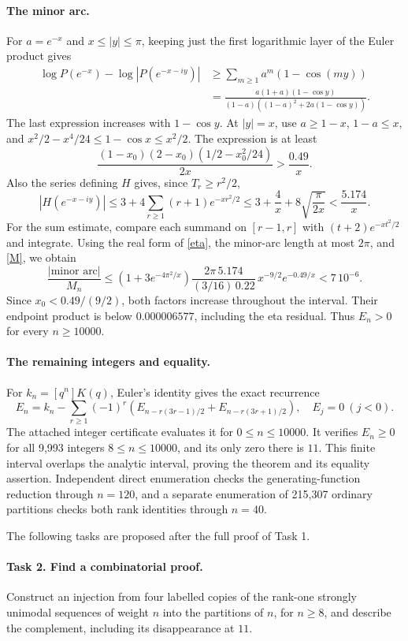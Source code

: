 \documentclass[11pt]{article}
\begin{document}
\paragraph{The minor arc.}
For \(a=e^{-x}\) and \(x\leq|y|\leq\pi\), keeping just the first
logarithmic layer of the Euler product gives
\begin{align*}
 \log P(e^{-x})-\log|P(e^{-x-iy})|
 &\geq\sum_{m\geq1}a^m(1-\cos(my))\\
 &=\frac{a(1+a)(1-\cos y)}
 {(1-a)((1-a)^2+2a(1-\cos y))}.
\end{align*}
The last expression increases with \(1-\cos y\).
At \(|y|=x\), use \(a\geq1-x\), \(1-a\leq x\), and
\(x^2/2-x^4/24\leq1-\cos x\leq x^2/2\). The expression is at least
\[
 \frac{(1-x_0)(2-x_0)(1/2-x_0^2/24)}{2x}>\frac{0.49}{x}.
\]
Also the series defining \(H\) gives, since \(T_r\geq r^2/2\),
\[
 |H(e^{-x-iy})|
 \leq3+4\sum_{r\geq1}(r+1)e^{-xr^2/2}
 \leq3+\frac4x+8\sqrt{\frac\pi{2x}}<\frac{5.174}{x}.
\]
For the sum estimate, compare each summand on \([r-1,r]\) with
\((t+2)e^{-xt^2/2}\) and integrate.
Using the real form of \eqref{eta}, the minor-arc length at most \(2\pi\),
and \eqref{M}, we obtain
\[
 \frac{|\text{minor arc}|}{M_n}
 \leq (1+3e^{-4\pi^2/x})
 \frac{2\pi\,5.174}{(3/16)\,0.22}\,
 x^{-9/2}e^{-0.49/x}<7\,10^{-6}.
\]
Since \(x_0<0.49/(9/2)\), both factors increase throughout the interval.
Their endpoint product is below \(0.000006577\), including the eta residual.
Thus \(E_n>0\) for every \(n\geq10000\).

\paragraph{The remaining integers and equality.}
For \(k_n=[q^n]K(q)\), Euler's identity gives the exact recurrence
\[
 E_n=k_n-\sum_{r\geq1}(-1)^r
 \left(E_{n-r(3r-1)/2}+E_{n-r(3r+1)/2}\right),
 \quad E_j=0\ (j<0).
\]
The attached integer certificate evaluates it for \(0\leq n\leq10000\).
It verifies \(E_n\geq0\) for all 9,993 integers \(8\leq n\leq10000\),
and its only zero there is \(11\). This finite interval overlaps the
analytic interval, proving the theorem and its equality assertion.
Independent direct enumeration checks the generating-function reduction
through \(n=120\), and a separate enumeration of 215,307 ordinary
partitions checks both rank identities through \(n=40\).

\medskip\noindent
The following tasks are proposed after the full proof of Task 1.

\paragraph{Task 2. Find a combinatorial proof.}
Construct an injection from four labelled copies of the rank-one strongly
unimodal sequences of weight \(n\) into the partitions of \(n\), for
\(n\geq8\), and describe the complement, including its disappearance at \(11\).
\end{document}
